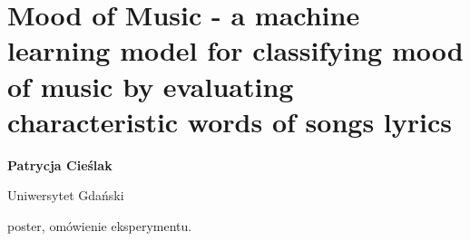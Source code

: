 \documentclass[\main/boa.tex]{subfiles}
\begin{document}
\section{Mood of Music - a machine learning model for classifying mood of music by evaluating characteristic words of songs lyrics}

\begin{minipage}{0.915\textwidth}
	\centering
  {\bf {}  Patrycja Cieślak}
\end{minipage}


\begin{affiliations}
\begin{minipage}{0.915\textwidth}
\centering
Uniwersytet Gdański  \\[-2pt]
\end{minipage}
\end{affiliations}

\vskip 0.3cm

 poster, omówienie eksperymentu. 
\end{document}
